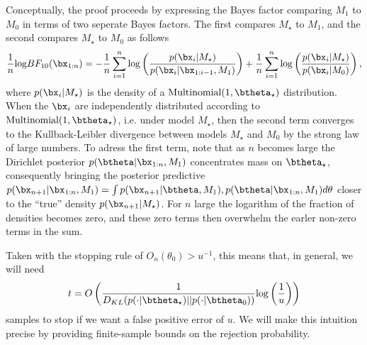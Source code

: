 \documentclass[11pt]{article}
\def\log{{\rm log}}
\begin{document}
Conceptually, the proof proceeds by expressing the Bayes factor comparing $M_1$ to $M_0$ in terms of two seperate Bayes factors.
The first compares $M_{\star}$ to $M_1$, and the second compares $M_{\star}$ to $M_0$ as follows
\begin{align*}
 \frac{1}{n} \log BF_{10}(\bx_{1:n}) = - \frac{1}{n}\sum_{i=1}^{n}\log \left( \frac{p(\bx_{i}|M_\star)}{p(\bx_{i}|\bx_{1:i-1},M_1)}\right) + \frac{1}{n}\sum_{i=1}^{n} \log  \left( \frac{p(\bx_{i}|M_\star)}{p(\bx_{i}|M_0)}\right),\\
\end{align*}
where  $p(\bx_i|M_\star)$ is the density of a $\text{Multinomial}(1,\btheta_{\star})$ distribution.
When the $\bx_i$ are independently distributed according to $\text{Multinomial}(1, \btheta_\star)$, i.e.
under model $M_\star$, then the second term converges to the Kullback-Leibler divergence between models $M_\star$ and $M_0$ by the strong law of large numbers.
To adress the first term, note that as $n$ becomes large the Dirichlet posterior $p(\btheta|\bx_{1:n}, M_1)$ concentrates mass on $\btheta_\star$, consequently bringing the posterior predictive $p(\bx_{n+1}|\bx_{1:n},M_1) =\int p(\bx_{n+1}|\btheta,M_1),p(\btheta|\bx_{1:n},M_1) d\theta$ closer to the ``true'' density $p(\bx_{n+1}|M_{\star})$.
For $n$ large the logarithm of the fraction of densities becomes zero, and these zero terms then overwhelm the earler non-zero terms in the sum.


Taken with the stopping rule of $O_n(\theta_0)>u^{-1}$, this means that, in general, we will need
\[
  t=O\left(\frac{1}{D_{KL}(p(\cdot|\btheta_{\star}) || p(\cdot|\btheta_0))} \log\left(\frac{1}{u}\right)\right)
\]
samples to stop if we want a false positive error of $u$. We will make this intuition precise by providing finite-sample bounds on the rejection probability.
\end{document}
